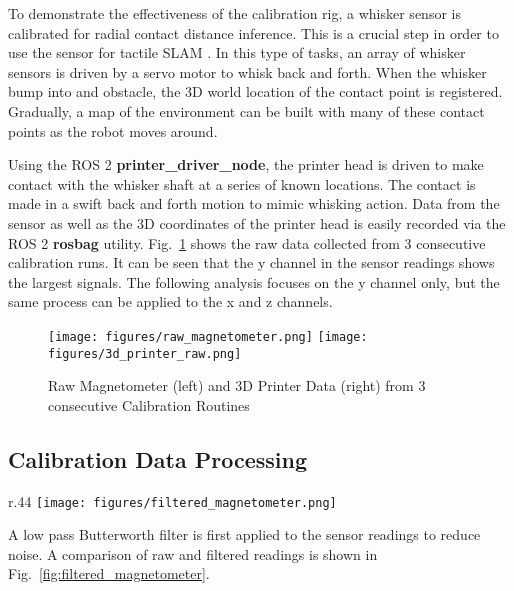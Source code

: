 \documentclass[runningheads]{llncs}
\begin{document}
To demonstrate the effectiveness of the calibration rig, a whisker sensor is calibrated for radial contact distance inference. This is a crucial step in order to use the sensor for tactile SLAM \cite{pearsonSimultaneousLocalisationMapping2013, leporaNaiveBayesNovelty2010}. In this type of tasks, an array of whisker sensors is driven by a servo motor to whisk back and forth. When the whisker bump into and obstacle, the 3D world location of the contact point is registered. Gradually, a map of the environment can be built with many of these contact points as the robot moves around.

Using the ROS 2 \textbf{printer\_driver\_node}, the printer head is driven to make contact with the whisker shaft at a series of known locations. The contact is made in a swift back and forth motion to mimic whisking action. Data from the sensor as well as the 3D coordinates of the printer head is easily recorded via the ROS 2 \textbf{rosbag} utility. Fig.~\ref{fig:calibration_routine} shows the raw data collected from 3 consecutive calibration runs. It can be seen that the y channel in the sensor readings shows the largest signals. The following analysis focuses on the y channel only, but the same process can be applied to the x and z channels.

\begin{figure}
    \centering
    \texttt{[image: figures/raw\_magnetometer.png]}
    \texttt{[image: figures/3d\_printer\_raw.png]}
    \caption{Raw Magnetometer (left) and 3D Printer Data (right) from 3 consecutive Calibration Routines}
    \label{fig:calibration_routine}
    \vspace{-10pt}
\end{figure}


\subsection{Calibration Data Processing}\label{sec:calibration_data_analysis}

\begin{wrapfigure}{r}{.44\textwidth}
    \centering
    \texttt{[image: figures/filtered\_magnetometer.png]}
    \caption{Raw and Filtered Magnetometer Reading in the Y Axis }
    \label{fig:filtered_magnetometer}
\end{wrapfigure}

A low pass Butterworth filter is first applied to the sensor readings to reduce noise. A comparison of raw and filtered readings is shown in Fig.~\ref{fig:filtered_magnetometer}.
\end{document}
